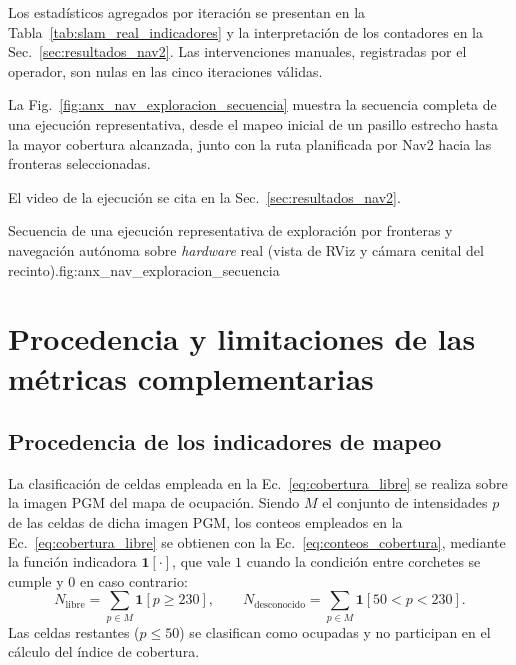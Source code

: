 \begin{appendices}
Los estadísticos agregados por iteración se presentan en la Tabla~\ref{tab:slam_real_indicadores} y la interpretación de los contadores en la Sec.~\ref{sec:resultados_nav2}. Las intervenciones manuales, registradas por el operador, son nulas en las cinco iteraciones válidas.

La Fig.~\ref{fig:anx_nav_exploracion_secuencia} muestra la secuencia completa de una ejecución representativa, desde el mapeo inicial de un pasillo estrecho hasta la mayor cobertura alcanzada, junto con la ruta planificada por Nav2 hacia las fronteras seleccionadas.

El video de la ejecución se cita en la Sec.~\ref{sec:resultados_nav2}.

\begin{utemMultiFigurePropia}{Secuencia de una ejecución representativa de exploración por fronteras y navegación autónoma sobre \textit{hardware} real (vista de RViz y cámara cenital del recinto).}{fig:anx_nav_exploracion_secuencia}
\hfill
{}
\\[0.4cm]
\hfill
{}
\end{utemMultiFigurePropia}

\section{Procedencia y limitaciones de las métricas complementarias}
\label{anx:resultados_metodologia}

\subsection{Procedencia de los indicadores de mapeo}

La clasificación de celdas empleada en la
Ec.~\eqref{eq:cobertura_libre} se realiza sobre la imagen PGM del mapa de ocupación. Siendo $M$ el conjunto de intensidades $p$ de las celdas de dicha
imagen PGM, los conteos empleados en la Ec.~\eqref{eq:cobertura_libre} se
obtienen con la Ec.~\eqref{eq:conteos_cobertura}, mediante la función indicadora $\mathbf{1}[\cdot]$, que vale $1$ cuando
la condición entre corchetes se cumple y $0$ en caso contrario:
\begin{equation}
N_{\mathrm{libre}}=\sum_{p\in M}\mathbf{1}\!\left[p\geq230\right],
\qquad
N_{\mathrm{desconocido}}=\sum_{p\in M}\mathbf{1}\!\left[50<p<230\right].
\label{eq:conteos_cobertura}
\end{equation}
Las celdas restantes ($p\leq50$) se clasifican como ocupadas y no participan
en el cálculo del índice de cobertura.


\end{appendices}
